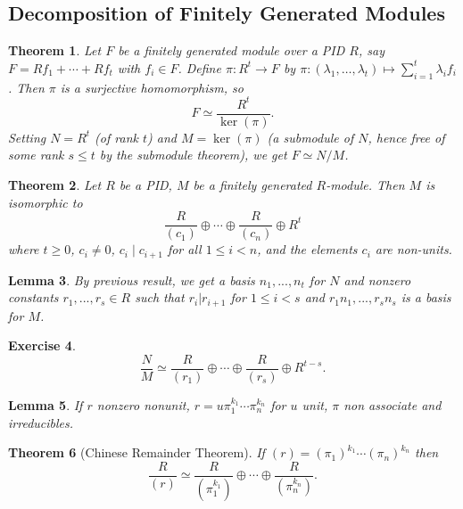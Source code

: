 \documentclass[a4paper,12pt]{article}
\newtheorem{thm}{Theorem}[section]
\newtheorem{lem}[thm]{Lemma}
\newtheorem{ex}[thm]{Exercise}
\begin{document}
\subsection{Decomposition of Finitely Generated Modules}
\begin{thm}
    Let $F$ be a finitely generated module over a PID $R$, say $F=Rf_1+\cdots+Rf_t$ with $f_i\in F$. Define $\pi:R^t\to F$ by $\pi:(\lambda_1,\dots,\lambda_t)\mapsto \sum_{i=1}^t \lambda_i f_i$. Then $\pi$ is a surjective homomorphism, so
    \[
    F\simeq \frac{R^t}{\ker(\pi)}.
    \]
    Setting $N=R^t$ (of rank $t$) and $M=\ker(\pi)$ (a submodule of $N$, hence free of some rank $s\leq t$ by the submodule theorem), we get $F\simeq N/M$.
\end{thm}
\begin{thm}
    Let $R$ be a PID, $M$ be a finitely generated $R$-module. Then $M$ is isomorphic to 
    \[
    \frac{R}{(c_1)} \oplus \cdots \oplus \frac{R}{(c_n)} \oplus R^t
    \]
    where $t \ge 0$, $c_i \neq 0$, $c_i \mid c_{i+1}$ for all $1 \leq i < n$, and the elements $c_i$ are non-units. 
\end{thm}
\begin{lem}
    By previous result, we get a basis $n_1,...,n_t$ for $N$ and nonzero constants $r_1,...,r_s\in R$ such that $r_i | r_{i+1}$ for $1\leq i < s$ and $r_1n_1,...,r_sn_s$ is a basis for $M$.
\end{lem}
\begin{ex}
    \[
    \frac{N}{M}\simeq \frac{R}{(r_1)}\oplus \cdots \oplus \frac{R}{(r_s)}\oplus R^{t-s}
    .\] 
\end{ex} 
\begin{lem}
    If $r$ nonzero nonunit, $r=u \pi_1^{k_1}\cdots \pi_n^{k_n}$ for $u$ unit, $\pi$ non associate and irreducibles. 
\end{lem}
\begin{thm} [Chinese Remainder Theorem]
    If $(r)=(\pi_1)^{k_1}\cdots (\pi_n)^{k_n}$ then 
    \[
    \frac{R}{(r)}\simeq \frac{R}{(\pi_1^{k_1})}\oplus \cdots \oplus \frac{R}{(\pi_n^{k_n})}
    .\] 
\end{thm}
\end{document}
